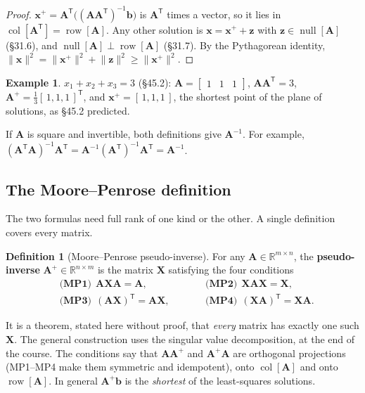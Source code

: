 \documentclass[11pt]{article}
\theoremstyle{plain}
\theoremstyle{definition}
\newtheorem{defn}{Definition}[section]
\newtheorem{ex}{Example}[section]
\theoremstyle{remark}
\newcommand{\R}{\mathbb{R}}
\newcommand{\vc}[1]{\mathbf{#1}}
\newcommand{\mt}[1]{\mathbf{#1}}
\newcommand{\norm}[1]{\lVert #1\rVert}
\newcommand{\T}{^{\mathsf{T}}}
\newcommand{\colsp}[1]{\operatorname{col}[#1]}
\newcommand{\rowsp}[1]{\operatorname{row}[#1]}
\newcommand{\nullsp}[1]{\operatorname{null}[#1]}
\begin{document}
\begin{proof}
$\vc{x}^{+}=\mt{A}\T\bigl((\mt{A}\mt{A}\T)^{-1}\vc{b}\bigr)$ is $\mt{A}\T$ times a
vector, so it lies in $\colsp{\mt{A}\T}=\rowsp{\mt{A}}$. Any other solution is
$\vc{x}=\vc{x}^{+}+\vc{z}$ with $\vc{z}\in\nullsp{\mt{A}}$ (\S31.6), and
$\nullsp{\mt{A}}\perp\rowsp{\mt{A}}$ (\S31.7). By the Pythagorean identity,
$\norm{\vc{x}}^{2}=\norm{\vc{x}^{+}}^{2}+\norm{\vc{z}}^{2}\ge\norm{\vc{x}^{+}}^{2}$.
\end{proof}

\begin{ex}
$x_1+x_2+x_3=3$ (\S45.2): $\mt{A}=\begin{bmatrix}1&1&1\end{bmatrix}$,
$\mt{A}\mt{A}\T=3$, $\mt{A}^{+}=\frac13[\,1,1,1\,]\T$, and
$\vc{x}^{+}=[\,1,1,1\,]$, the shortest point of the plane of solutions, as \S45.2
predicted.
\end{ex}

\noindent If $\mt{A}$ is square and invertible, both definitions give $\mt{A}^{-1}$.
For example, $(\mt{A}\T\mt{A})^{-1}\mt{A}\T=\mt{A}^{-1}(\mt{A}\T)^{-1}\mt{A}\T=\mt{A}^{-1}$.

\subsection{The Moore--Penrose definition}
The two formulas need full rank of one kind or the other. A single definition
covers every matrix.

\begin{defn}[Moore--Penrose pseudo-inverse]
For any $\mt{A}\in\R^{m\times n}$, the \textbf{pseudo-inverse} $\mt{A}^{+}\in\R^{n\times m}$
is the matrix $\mt{X}$ satisfying the four conditions
\[
  \begin{aligned}
  &\textbf{(MP1)}\ \ \mt{A}\mt{X}\mt{A}=\mt{A}, &\qquad
  &\textbf{(MP2)}\ \ \mt{X}\mt{A}\mt{X}=\mt{X},\\
  &\textbf{(MP3)}\ \ (\mt{A}\mt{X})\T=\mt{A}\mt{X}, &\qquad
  &\textbf{(MP4)}\ \ (\mt{X}\mt{A})\T=\mt{X}\mt{A}.
  \end{aligned}
\]
\end{defn}

\noindent It is a theorem, stated here without proof, that \emph{every} matrix has
exactly one such $\mt{X}$. The general construction uses the singular value
decomposition, at the end of the course. The conditions say that
$\mt{A}\mt{A}^{+}$ and $\mt{A}^{+}\mt{A}$ are orthogonal projections (MP1--MP4
make them symmetric and idempotent), onto $\colsp{\mt{A}}$ and onto
$\rowsp{\mt{A}}$. In general $\mt{A}^{+}\vc{b}$ is the \emph{shortest} of the
least-squares solutions.
\end{document}
